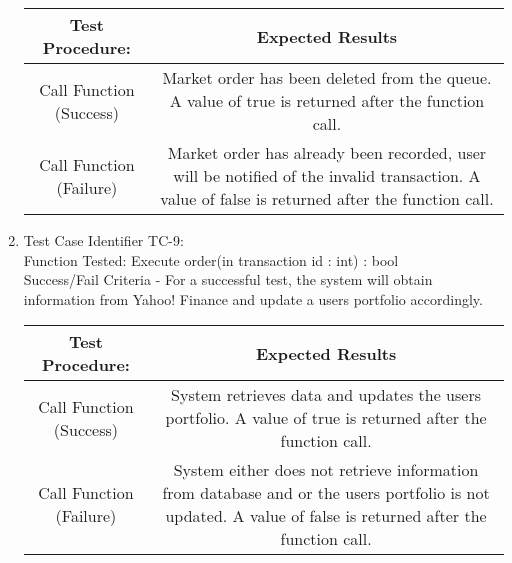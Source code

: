 \begin{enumerate}
    \begin{tabular}{| c | c |}
    \hline
    \textbf{Test Procedure:} & \textbf{Expected Results} \\ \hline
    Call Function (Success) & Market order has been deleted from the queue. A
    value of true is returned after the function call. \\ \hline
    Call Function (Failure) & Market order has already been recorded, user will
    be notified of the invalid transaction. A value of false is returned after
    the function call. \\ \hline
    \end{tabular}
  \item
  Test Case Identifier TC-9:\\
    Function Tested: Execute order(in transaction id : int) : bool \\
    Success/Fail Criteria - For a successful test, the system will obtain information from Yahoo! Finance and update a users portfolio accordingly.\\
    \begin{tabular}{| c | c |}
    \hline
    \textbf{Test Procedure:} & \textbf{Expected Results} \\ \hline
    Call Function (Success) & System retrieves data and updates the users
    portfolio. A value of true is returned after the function call.\\ \hline
    Call Function (Failure) & System either does not retrieve information from
    database and or the users portfolio is not updated. A value of false is
    returned after the function call. \\ \hline
    \end{tabular}
    \end{enumerate}

